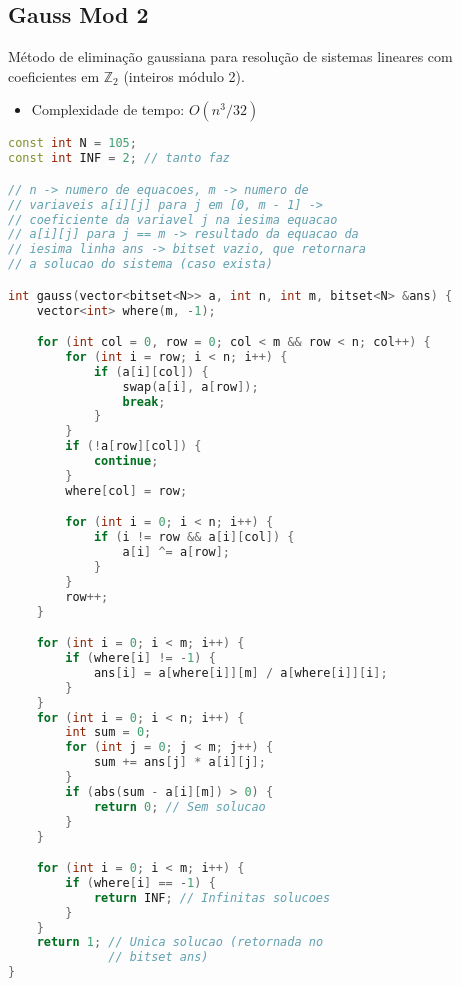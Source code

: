 \documentclass[11pt, a4paper, oneside]{book}
\begin{document}
\hfill

\subsection{Gauss Mod 2}


Método de eliminação gaussiana para resolução de sistemas lineares com coeficientes em $\mathbb{Z}_2$ (inteiros módulo 2).



\begin{itemize}
\item Complexidade de tempo: $O(n^3/32)$
\end{itemize}

\hfill

\begin{multicols}{2}
\begin{lstlisting}[language=C++]
const int N = 105;
const int INF = 2; // tanto faz

// n -> numero de equacoes, m -> numero de
// variaveis a[i][j] para j em [0, m - 1] ->
// coeficiente da variavel j na iesima equacao
// a[i][j] para j == m -> resultado da equacao da
// iesima linha ans -> bitset vazio, que retornara
// a solucao do sistema (caso exista)

int gauss(vector<bitset<N>> a, int n, int m, bitset<N> &ans) {
    vector<int> where(m, -1);

    for (int col = 0, row = 0; col < m && row < n; col++) {
        for (int i = row; i < n; i++) {
            if (a[i][col]) {
                swap(a[i], a[row]);
                break;
            }
        }
        if (!a[row][col]) {
            continue;
        }
        where[col] = row;

        for (int i = 0; i < n; i++) {
            if (i != row && a[i][col]) {
                a[i] ^= a[row];
            }
        }
        row++;
    }

    for (int i = 0; i < m; i++) {
        if (where[i] != -1) {
            ans[i] = a[where[i]][m] / a[where[i]][i];
        }
    }
    for (int i = 0; i < n; i++) {
        int sum = 0;
        for (int j = 0; j < m; j++) {
            sum += ans[j] * a[i][j];
        }
        if (abs(sum - a[i][m]) > 0) {
            return 0; // Sem solucao
        }
    }

    for (int i = 0; i < m; i++) {
        if (where[i] == -1) {
            return INF; // Infinitas solucoes
        }
    }
    return 1; // Unica solucao (retornada no
              // bitset ans)
}
\end{lstlisting}
\end{multicols}
\end{document}
